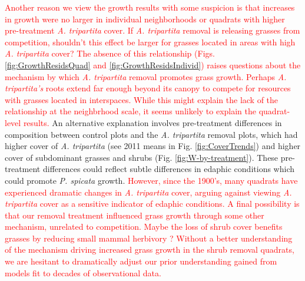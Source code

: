 \documentclass[11pt]{article}
\newcommand{\new}{\textcolor{red}}
\begin{document}
\begin{doublespacing}
\new{Another reason we view the growth results with some suspicion is that increases in growth were no larger in individual neighborhoods or quadrats with higher pre-treatment \textit{A. tripartita} cover. If \textit{A. tripartita} removal is releasing grasses from competition, shouldn't this effect be larger for grasses located in areas with high \textit{A. tripartita} cover? The absence of this relationship (Figs. \ref{fig:GrowthResidsQuad} and \ref{fig:GrowthResidsIndivid}) raises questions about the mechanism by which \textit{A. tripartita} removal promotes grass growth. Perhaps \textit{A. tripartita's} roots extend far enough beyond its canopy to compete for resources with grasses located in interspaces. While this might explain the lack of the relationship at the neighbrhood scale, it seems unlikely to explain the quadrat-level results. } 
An alternative explanation involves pre-treatment differences in composition between control plots and  the \textit{A. tripartita} removal plots, which had higher cover of \textit{A. tripartita} (see 2011 means in Fig. \ref{fig:CoverTrends}) and higher cover of subdominant grasses and shrubs (Fig. \ref{fig:W-by-treatment}). These pre-treatment differences could reflect subtle differences in edaphic conditions which could promote \textit{P. spicata} growth. \new{However, since the 1900's, many quadrats have experienced dramatic changes in \textit{A. tripartita} cover, arguing against viewing \textit{A. tripartita} cover as a sensitive indicator of edaphic conditions. 
A final possibility is that our removal treatment influenced grass growth through some other mechanism, unrelated to competition. Maybe the loss of shrub cover benefits grasses by reducing small mammal herbivory \citep{Orrock2010}? Without a better understanding of the mechanism driving increased grass growth in the shrub removal quadrats, we are hesitant to dramatically adjust our prior understanding gained from models fit to decades of observational data.  }


\end{doublespacing}
\end{document}
